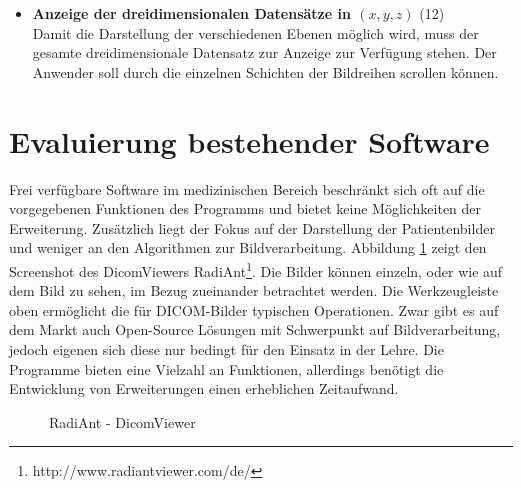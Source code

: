 \begin{itemize}
\item \textbf{Anzeige der dreidimensionalen Datensätze in $(x, y, z)$} (12)\\
	 Damit die Darstellung der verschiedenen Ebenen möglich wird, muss der gesamte dreidimensionale Datensatz zur Anzeige zur Verfügung stehen. Der Anwender soll durch die einzelnen Schichten der Bildreihen scrollen können.
\end{itemize}


\section{Evaluierung bestehender Software}

Frei verfügbare Software im medizinischen Bereich beschränkt sich oft auf die vorgegebenen Funktionen des Programms und bietet keine Möglichkeiten der Erweiterung. Zusätzlich liegt der Fokus auf der Darstellung der Patientenbilder und weniger an den Algorithmen zur Bildverarbeitung. Abbildung \ref{radiant} zeigt den Screenshot des DicomViewers RadiAnt\footnote{http://www.radiantviewer.com/de/}. Die Bilder können einzeln, oder wie auf dem Bild zu sehen, im Bezug zueinander betrachtet werden. Die Werkzeugleiste oben ermöglicht die für DICOM-Bilder typischen Operationen.
Zwar gibt es auf dem Markt auch Open-Source Lösungen mit Schwerpunkt auf Bildverarbeitung, jedoch eigenen sich diese nur bedingt für den Einsatz in der Lehre. Die Programme bieten eine Vielzahl an Funktionen, allerdings benötigt die Entwicklung von Erweiterungen einen erheblichen Zeitaufwand.
 
\begin{figure}[htbp]
  \vspace{0.5cm}
  \centering
   \caption{RadiAnt - DicomViewer}
  \label{radiant}
  \vspace{0.5cm}
\end{figure}


